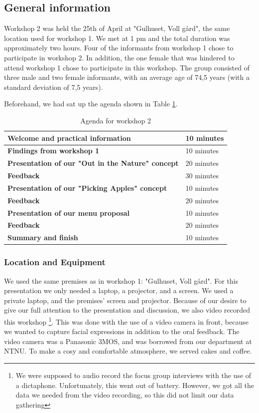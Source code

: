 \subsection{General information}
Workshop 2 was held the 25th of April at "Gulhuset, Voll gård", the same location used for workshop 1. We met at 1 pm and the total duration was approximately two hours. Four of the informants from workshop 1 chose to participate in workshop 2. In addition, the one female that was hindered to attend workshop 1 chose to participate in this workshop. The group consisted of three male and two female informants, with an average age of 74,5 years (with a standard deviation of 7,5 years).  

Beforehand, we had sat up the agenda shown in Table \ref{tab:agendaW2}. 


\begin{table} [ht!]
\centering
    \begin{tabular}{|l|l|}
       \hline
       \textbf{Welcome and practical information} & 10 minutes  \\ \hline
       \textbf{Findings from workshop 1} & 10 minutes \\ \hline
       \textbf{Presentation of our "Out in the Nature" concept} & 20 minutes \\ \hline
	   \textbf{Feedback} & 30 minutes \\ \hline
	   \textbf{Presentation of our "Picking Apples" concept} & 10 minutes \\ \hline
	   \textbf{Feedback} & 20 minutes \\ \hline
	   \textbf{Presentation of our menu proposal} & 10 minutes \\ \hline
	   \textbf{Feedback} & 20 minutes \\ \hline
	   \textbf{Summary and finish} & 10 minutes \\ \hline
    \end{tabular}
    \caption[Workshop 2 agenda]{Agenda for workshop 2}
    \label{tab:agendaW2}
\end{table} 


\subsubsection{Location and Equipment}
We used the same premises as in workshop 1: "Gulhuset, Voll gård". 
For this presentation we only needed a laptop, a projector, and a screen. We used a private laptop, and the premises' screen and projector. Because of our desire to give our full attention to the presentation and discussion, we also video recorded this workshop  \footnote{We were supposed to audio record the focus group interviews with the use of a dictaphone. Unfortunately, this went out of battery. However, we got all the data we needed from the video recording, so this did not limit our data gathering}. This was done with the use of a video camera in front, because we wanted to capture facial expressions in addition to the oral feedback. The video camera was a Panasonic 3MOS, and was borrowed from our department at NTNU. To make a cosy and comfortable atmosphere, we served cakes and coffee.   

